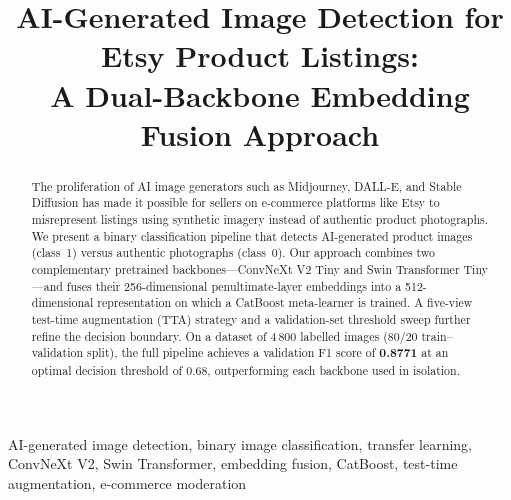 \documentclass[conference]{IEEEtran}
\begin{document}
\title{AI-Generated Image Detection for Etsy Product Listings:\\
       A Dual-Backbone Embedding Fusion Approach}

\author{
  \and
}

\maketitle

\begin{abstract}
The proliferation of AI image generators such as Midjourney, DALL-E, and Stable
Diffusion has made it possible for sellers on e-commerce platforms like Etsy to
misrepresent listings using synthetic imagery instead of authentic product
photographs.  We present a binary classification pipeline that detects
AI-generated product images (class~1) versus authentic photographs (class~0).
Our approach combines two complementary pretrained backbones—ConvNeXt V2 Tiny
and Swin Transformer Tiny—and fuses their 256-dimensional penultimate-layer
embeddings into a 512-dimensional representation on which a CatBoost meta-learner
is trained.  A five-view test-time augmentation (TTA) strategy and a validation-set
threshold sweep further refine the decision boundary.  On a dataset of 4\,800
labelled images (80/20 train--validation split), the full pipeline achieves a
validation F1 score of \textbf{0.8771} at an optimal decision threshold of 0.68,
outperforming each backbone used in isolation.
\end{abstract}

\begin{IEEEkeywords}
AI-generated image detection, binary image classification, transfer learning,
ConvNeXt V2, Swin Transformer, embedding fusion, CatBoost, test-time augmentation,
e-commerce moderation
\end{IEEEkeywords}
\end{document}
